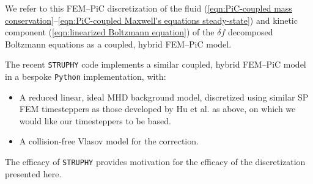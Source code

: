     We refer to this FEM--PiC discretization of the fluid (\ref{eqn:PiC-coupled mass conservation}--\ref{eqn:PiC-coupled Maxwell's equations steady-state}) and kinetic component (\ref{eqn:linearized Boltzmann equation}) of the $\delta\!f$ decomposed Boltzmann equations as a coupled, hybrid FEM--PiC model.

    The recent \texttt{STRUPHY} code \cite{Holderied_Possanner_Wang_2021, Holderied_2022, Li_et_al_2023} implements a similar coupled, hybrid FEM--PiC model in a bespoke \texttt{Python} implementation, with:
    \begin{itemize}
      \item  A reduced linear, ideal MHD background model, discretized using similar SP FEM timesteppers as those developed by Hu et al. \cite{Hu_Xu_2015, Hu_Ma_Yu_2017, Hu_Lee_Xu_2021, Green_et_al_2022, LFM22, Laakmann_Hu_Farrell_2022} as above, on which we would like our timesteppers to be based.
      \item  A collision-free Vlasov model for the correction.
    \end{itemize}
    The efficacy of \texttt{STRUPHY} provides motivation for the efficacy of the discretization presented here.
    
